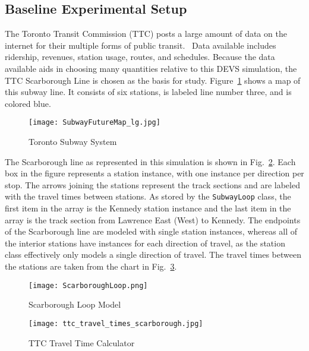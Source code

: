 \subsection{Baseline Experimental Setup}\label{section:experiment_setup}
The Toronto Transit Commission (TTC) posts a large amount of data on the internet for their multiple forms of public transit.~\cite{ttcdata} Data available includes ridership, revenues, station usage, routes, and schedules.  Because the data available aids in choosing many quantities relative to this DEVS simulation, the TTC Scarborough Line is chosen as the basis for study.  Figure~\ref{fig:subwaymap} shows a map of this subway line.  It consists of six stations, is labeled line number three, and is colored blue.
%
\begin{figure}[htb]
	\centering
	\texttt{[image: SubwayFutureMap\_lg.jpg]}
	\caption{Toronto Subway System~\cite{ttcmap}}
	\label{fig:subwaymap}
\end{figure}
The Scarborough line as represented in this simulation is shown in Fig.~\ref{fig:scarborough}.  Each box in the figure represents a station instance, with one instance per direction per stop.  The arrows joining the stations represent the track sections and are labeled with the travel times between stations. As stored by the \texttt{SubwayLoop} class, the first item in the array is the Kennedy station instance and the last item in the array is the track section from Lawrence East (West) to Kennedy. The endpoints of the Scarborough line are modeled with single station instances, whereas all of the interior stations have instances for each direction of travel, as the station class effectively only models a single direction of travel.  The travel times between the stations are taken from the chart in Fig.~\ref{fig:traveltimes}.
%
\begin{figure}[htb]
	\centering
	\texttt{[image: ScarboroughLoop.png]}
	\caption{Scarborough Loop Model}
	\label{fig:scarborough}
\end{figure}
%
\begin{figure}[htb]
	\centering
	\texttt{[image: ttc\_travel\_times\_scarborough.jpg]}
	\caption{TTC Travel Time Calculator~\cite{subwaytimes}}
	\label{fig:traveltimes}
\end{figure}

